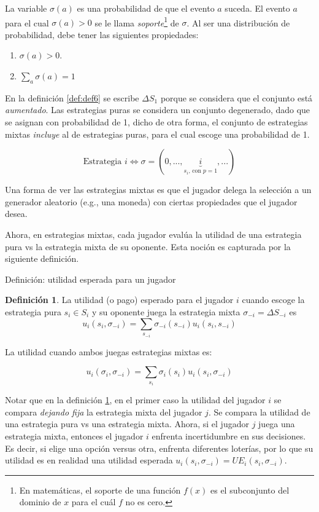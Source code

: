 \documentclass[12pt]{scrartcl}
\theoremstyle{definition}
\newtheorem{defi}{Definición}[section]
\begin{document}
La variable $\sigma(a)$ es una probabilidad de que el evento $a$ suceda. El evento $a$ para el cual $\sigma(a) > 0$ se le llama \textit{soporte}\footnote{
En matemáticas, el soporte de una función $f(x)$ es el subconjunto del dominio de $x$ para el cuál $f$ no es cero.
} de $\sigma$. Al ser una distribución de probabilidad, debe tener las siguientes propiedades:

\begin{enumerate}
    \item $\sigma(a) > 0$.
    \item $\sum_a \sigma(a) = 1$
\end{enumerate}
En la definición \ref{def:def6} se escribe $\Delta S_1$ porque se considera que el conjunto está \textit{aumentado}. Las estrategias puras se considera un conjunto degenerado, dado que se asignan con probabilidad de 1, dicho de otra forma, el conjunto de estrategias mixtas \textit{incluye} al de estrategias puras, para el cual escoge una probabilidad de 1. 

\[ \text{Estrategia } i \Longleftrightarrow \sigma = (0, ..., \underbrace{i}_\text{$s_i$, con $p=1$}, ... )\]

Una forma de ver las estrategias mixtas es que el jugador delega la selección a un generador aleatorio (e.g., una moneda) con ciertas propiedades que el jugador desea. 

Ahora, en estrategias mixtas, cada jugador evalúa la utilidad de una estrategia pura vs la estrategia mixta de su oponente. Esta noción es capturada por la siguiente definición.

\begin{mybox}{Definición: utilidad esperada para un jugador}
    \begin{defi}
        La utilidad (o pago) esperado para el jugador $i$ cuando escoge la estrategia pura $s_i \in S_i$ y su oponente juega la estrategia mixta $\sigma_{-i} = \Delta S_{-i}$ es 
        \[ u_i(s_i, \sigma_{-i}) = \sum_{s_{-i}} \sigma_{-i}(s_{-i})u_i(s_i,s_{-i}) \]
        
        La utilidad cuando ambos juegas estrategias mixtas es:
        
        \[ u_i(\sigma_i, \sigma_{-i}) = \sum_{s_{i}} \sigma_{i}(s_i)u_i(s_i,\sigma_{-i}) \]
        \label{def:def_mix_util}
    \end{defi}
\end{mybox}

Notar que en la definición \ref{def:def_mix_util}, en el primer caso la utilidad del jugador $i$ se compara \textit{dejando fija} la estrategia mixta del jugador $j$. Se compara la utilidad de una estrategia pura vs una estrategia mixta. Ahora, si el jugador $j$ juega una estrategia mixta, entonces el jugador $i$ enfrenta incertidumbre en sus decisiones. Es decir, si elige una opción versus otra, enfrenta diferentes loterías, por lo que su utilidad es en realidad una utilidad esperada $u_i(s_i, \sigma_{-i}) = UE_i(s_i, \sigma_{-i})$. 
\end{document}

